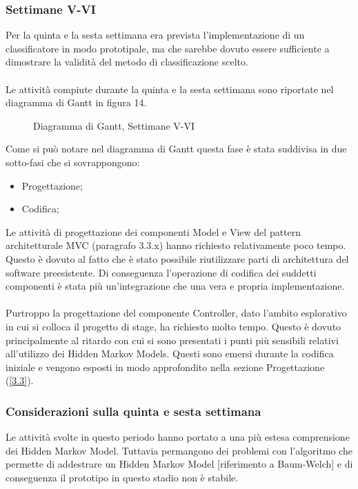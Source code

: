 \subsubsection{Settimane V-VI}
\label{3.1.3}
Per la quinta e la sesta settimana era prevista l'implementazione di un classificatore in modo prototipale, ma che sarebbe dovuto essere sufficiente a dimostrare la validità del metodo di classificazione scelto.\\\\
Le attività compiute durante la quinta e la sesta settimana sono riportate nel diagramma di Gantt in figura 14.
\begin{figure}[H]
\centering
\noindent{}
\caption{Diagramma di Gantt, Settimane V-VI}
\end{figure}

Come si può notare nel diagramma di Gantt questa fase è stata suddivisa in due sotto-fasi che si sovrappongono:
\begin{itemize}
\item Progettazione;
\item Codifica;
\end{itemize}
Le attività di progettazione dei componenti Model e View del pattern architetturale MVC (paragrafo 3.3.x) hanno richiesto relativamente poco tempo. Questo è dovuto al fatto che è stato possibile riutilizzare parti di architettura del software preesistente. Di conseguenza l'operazione di codifica dei suddetti componenti è stata più un'integrazione che una vera e propria implementazione.\\\\
Purtroppo la progettazione del componente Controller, dato l'ambito esplorativo in cui si colloca il progetto di stage, ha richiesto molto tempo. Questo è dovuto principalmente al ritardo con cui si sono presentati i punti più sensibili relativi all'utilizzo dei Hidden Markov Models. Questi sono emersi durante la codifica iniziale e vengono esposti in modo approfondito nella sezione Progettazione (\ref{3.3}).


\subsubsection*{Considerazioni sulla quinta e sesta settimana}
\label{3.1.3.1}
Le attività svolte in questo periodo hanno portato a una più estesa comprensione dei Hidden Markov Model. Tuttavia permangono dei problemi con l'algoritmo che permette di addestrare un Hidden Markov Model [riferimento a Baum-Welch] e di conseguenza il prototipo in questo stadio non è stabile.
